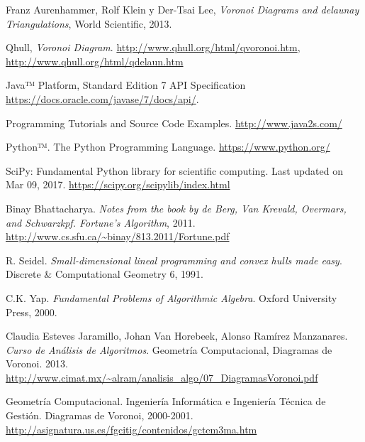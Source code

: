 \documentclass[a4paper,11pt]{book}
\begin{document}


\tableofcontents
\listoffigures
\renewcommand\listfigurename{\centering Índice de Figuras}











\begin{thebibliography}{1}

 Franz Aurenhammer, Rolf Klein y Der-Tsai Lee, \emph{Voronoi Diagrams and delaunay Triangulations}, World Scientific, 2013.

 Qhull, \emph{Voronoi Diagram}.  \url{http://www.qhull.org/html/qvoronoi.htm},  \url{http://www.qhull.org/html/qdelaun.htm}

 Java™ Platform, Standard Edition 7
API Specification \url{https://docs.oracle.com/javase/7/docs/api/}.

 Programming Tutorials and Source Code Examples. \url{http://www.java2s.com/}

 Python™. The Python Programming Language.
\url{https://www.python.org/}

 SciPy: Fundamental Python library for scientific computing. Last updated on Mar 09, 2017.
\url{https://scipy.org/scipylib/index.html}

 Binay Bhattacharya. \emph{Notes from the book by de Berg, Van Krevald, Overmars, and Schwarzkpf. Fortune’s Algorithm}, 2011.
\url{http://www.cs.sfu.ca/~binay/813.2011/Fortune.pdf}

 R. Seidel. \emph{Small-dimensional lineal programming and convex hulls made easy}. Discrete \& Computational Geometry 6, 1991.

 C.K. Yap. \emph{Fundamental Problems of Algorithmic Algebra}. Oxford University Press, 2000.

 Claudia Esteves Jaramillo, Johan Van Horebeek, Alonso Ramírez Manzanares. \emph{Curso de Análisis de Algoritmos}. Geometría Computacional, Diagramas de Voronoi. 2013. \url{http://www.cimat.mx/~alram/analisis_algo/07_DiagramasVoronoi.pdf}

 Geometría Computacional. Ingeniería Informática e Ingeniería Técnica de Gestión. Diagramas de Voronoi, 2000-2001. \url{http://asignatura.us.es/fgcitig/contenidos/gctem3ma.htm}


\end{thebibliography}
\end{document}
